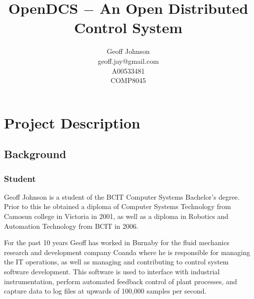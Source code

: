 \documentclass[11pt]{article}
\begin{document}
\nocite{*}

  \title{%
    OpenDCS $-$ An Open Distributed Control System\vspace{2em}
  }

  \author{%
    Geoff Johnson \vspace{0.5em} \\
    geoff.jay@gmail.com \vspace{0.5em} \\
    A00533481 \vspace{0.5em} \\
    COMP8045 \vspace{0.5em}
  }

  \maketitle
  \thispagestyle{empty}
  \newpage
  \mbox{}
  \thispagestyle{empty}

  \newpage
  \addtocounter{page}{-1}
  \tableofcontents
  \listoffigures
  \listoftables
  \lstlistoflistings

  \newpage


  \section{Project Description}\label{sec:desc}

    \subsection{Background}\label{sec:desc-bg}

      \subsubsection{Student}\label{sec:desc-bg-student}

        Geoff Johnson is a student of the BCIT Computer Systems Bachelor's degree.
        Prior to this he obtained a diploma of Computer Systems Technology from
        Camosun college in Victoria in 2001, as well as a diploma in Robotics and
        Automation Technology from BCIT in 2006.

        For the past 10 years Geoff has worked in Burnaby for the fluid mechanics
        research and development company Coanda where he is responsible for managing
        the IT operations, as well as managing and contributing to control system
        software development. This software is used to interface with industrial
        instrumentation, perform automated feedback control of plant processes,
        and capture data to log files at upwards of 100,000 samples per second.
\end{document}
